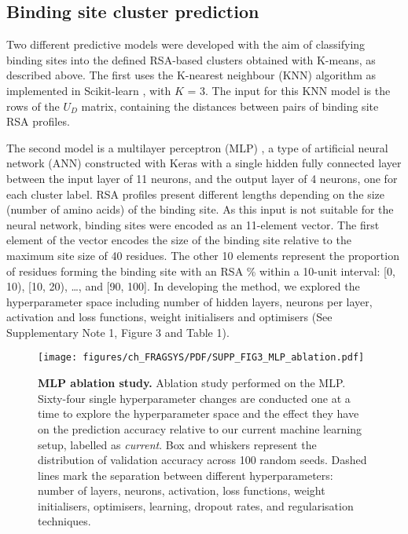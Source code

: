 \subsection{Binding site cluster prediction}

Two different predictive models were developed with the aim of classifying binding sites into the defined RSA-based clusters obtained with K-means, as described above. The first  uses the K-nearest neighbour (KNN) algorithm as implemented in Scikit-learn \cite{PEDREGOSA_2011_SKLEARN}, with $K$ = 3. The input for this KNN model is the rows of the $U_{D}$ matrix, containing the distances between pairs of binding site RSA profiles.

The second model is a multilayer perceptron (MLP) \cite{CYBENKO_1989_MLP}, a type of artificial neural network (ANN) constructed with Keras \cite{CHOLLET_2015_KERAS} with a single hidden fully connected layer between the input layer of 11 neurons, and the output layer of 4 neurons, one for each cluster label. RSA profiles present different lengths depending on the size (number of amino acids) of the binding site. As this input is not suitable for the neural network, binding sites were encoded as an 11-element vector. The first element of the vector encodes the size of the binding site relative to the maximum site size of 40 residues. The other 10 elements represent the proportion of residues forming the binding site with an RSA \% within a 10-unit interval: [0, 10), [10, 20), …, and [90, 100]. In developing the method, we explored the hyperparameter space including number of hidden layers, neurons per layer, activation and loss functions, weight initialisers and optimisers (See Supplementary Note 1, Figure 3 and Table 1).

\begin{figure}[ht!]
    \centering
    \texttt{[image: figures/ch\_FRAGSYS/PDF/SUPP\_FIG3\_MLP\_ablation.pdf]}
    \caption[MLP ablation study]{\textbf{MLP ablation study.} Ablation study performed on the MLP. Sixty-four single hyperparameter changes are conducted one at a time to explore the hyperparameter space and the effect they have on the prediction accuracy relative to our current machine learning setup, labelled as \textit{current}. Box and whiskers represent the distribution of validation accuracy across 100 random seeds. Dashed lines mark the separation between different hyperparameters: number of layers, neurons, activation, loss functions, weight initialisers, optimisers, learning, dropout rates, and regularisation techniques.}
    \label{fig:mlp_ablation}
\end{figure}

